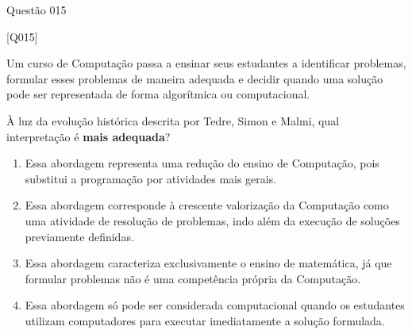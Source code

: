 \documentclass[xcolor=dvipsnames,table]{beamer}
\begin{document}
{\logo{}
\begin{frame}{Questão 015}

    \footnotesize

    \begin{block}{[Q015]}

    Um curso de Computação passa a ensinar seus estudantes a identificar problemas, formular esses problemas de maneira adequada e decidir quando uma solução pode ser representada de forma algorítmica ou computacional.

    À luz da evolução histórica descrita por Tedre, Simon e Malmi, qual interpretação é \textbf{mais adequada}?

    \end{block}

    \begin{enumerate}[label=(\Alph*)]

        \item Essa abordagem representa uma redução do ensino de Computação, pois substitui a programação por atividades mais gerais.

        \item Essa abordagem corresponde à crescente valorização da Computação como uma atividade de resolução de problemas, indo além da execução de soluções previamente definidas.

        \item Essa abordagem caracteriza exclusivamente o ensino de matemática, já que formular problemas não é uma competência própria da Computação.

        \item Essa abordagem só pode ser considerada computacional quando os estudantes utilizam computadores para executar imediatamente a solução formulada.

    \end{enumerate}

\end{frame}
}
\end{document}
